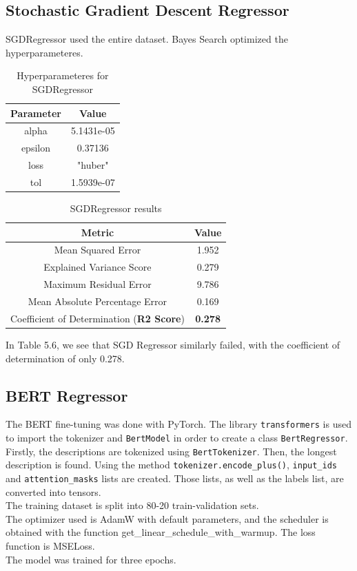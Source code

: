 \documentclass[times, utf8, zavrsni, english]{fer}
\begin{document}
\subsection{Stochastic Gradient Descent Regressor}
SGDRegressor used the entire dataset. Bayes Search optimized the hyperparameteres.
\begin{table}[h!]

		\centering
		\begin{tabular}{|| c | c ||} 
			\hline
			Parameter & Value \\ [0.5ex] 
			\hline\hline
			alpha & 5.1431e-05  \\ \hline
			epsilon & 0.37136 \\ \hline
			loss & "huber" \\ \hline
			tol & 1.5939e-07  \\ 
			\hline
		\end{tabular}
		\caption{Hyperparameteres for SGDRegressor}
		\label{table:8}
\end{table}
\begin{table} [h!]
		\centering
		\begin{tabular}{|| c | c ||} 
			\hline
			Metric & Value \\ [0.5ex] 
			\hline\hline
			Mean Squared Error & 1.952  \\ \hline
			Explained Variance Score & 0.279\\ \hline
			Maximum Residual Error & 9.786 \\ \hline
			Mean Absolute Percentage Error & 0.169 \\ \hline
			Coefficient of Determination (\textbf{R2 Score}) & \textbf{0.278} \\
			\hline
		\end{tabular}
		\caption{SGDRegressor results}
		\label{table:9}
\end{table}

In Table 5.6, we see that SGD Regressor similarly failed, with the coefficient of determination of only 0.278.

\subsection{BERT Regressor}
The BERT fine-tuning was done with PyTorch. The library \texttt{transformers} is used to import the tokenizer and \texttt{BertModel} in order to create a class \texttt{BertRegressor}.
Firstly, the descriptions are tokenized using \texttt{BertTokenizer}. Then, the longest description is found. Using the method \texttt{tokenizer.encode\_plus()}, \texttt{input\_ids} and \texttt{attention\_masks} lists are created. Those lists, as well as the labels list, are converted into tensors. \\
The training dataset is split into 80-20 train-validation sets. \\
The optimizer used is AdamW with default parameters, and the scheduler is obtained with the function get\_linear\_schedule\_with\_warmup. 
The loss function is MSELoss.\\
The model was trained for three epochs. 
\end{document}
